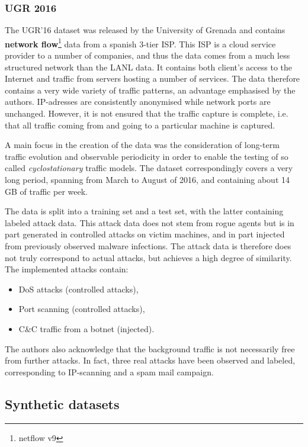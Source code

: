 \subsubsection*{UGR 2016 \cite{macia2018ugr}}

The UGR'16 dataset was released by the University of Grenada and contains \textbf{network flow}\footnote{netflow v9} data from a spanish 3-tier ISP. This ISP is a cloud service provider to a number of companies, and thus the data comes from a much less structured network than the LANL data. It contains both client's access to the Internet and traffic from servers hosting a number of services. The data therefore contains a very wide variety of traffic patterns, an advantage emphasised by the authors. IP-adresses are consistently anonymised while network ports are unchanged. However, it is not ensured that the traffic capture is complete, i.e. that all traffic coming from and going to a particular machine is captured.

A main focus in the creation of the data was the consideration of long-term traffic evolution and observable periodicity in order to enable the testing of so called \textit{cyclostationary} traffic models. The dataset correspondingly covers a very long period, spanning from March to August of 2016, and containing about 14 GB of traffic per week. 

The data is split into a training set and a test set, with the latter containing labeled attack data. This attack data does not stem from rogue agents but is in part generated in controlled attacks on victim machines, and in part injected from previously observed malware infections. The attack data is therefore does not truly correspond to actual attacks, but achieves a high degree of similarity. The implemented attacks contain:
\begin{itemize}
\item DoS attacks (controlled attacks),
\item Port scanning (controlled attacks),
\item C\&C traffic from a botnet (injected).
\end{itemize}

The authors also acknowledge that the background traffic is not necessarily free from further attacks. In fact, three real attacks have been observed and labeled, corresponding to IP-scanning and a spam mail campaign.

\subsection{Synthetic datasets}

